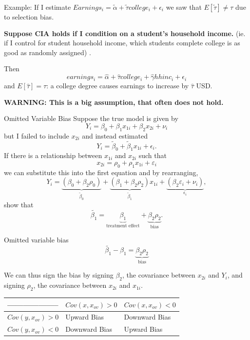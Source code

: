 \documentclass[
  ignorenonframetext,
]{beamer}
\begin{document}
\begin{frame}{Example:}
\protect\hypertarget{example-2}{}
If I estimate
\(Earnings_i=\tilde{\alpha}+\tilde{\tau}college_i+\epsilon_i\) we saw
that \(E[\tilde{\tau}]\neq\tau\) due to selection bias.

\textbf{Suppose CIA holds if I condition on a student's household
income.} (ie. if I control for student household income, which students
complete college is as good as randomly assigned) .

Then \[
earnings_i=\hat{\alpha}+\hat{\tau}college_i+\hat{\gamma}hhinc_i+\epsilon_i
\] and \(E[\hat{\tau}]=\tau\): a college degree causes earnings to
increase by \(\hat{\tau}\) USD.

\textbf{WARNING: This is a big assumption, that often does not hold.}
\end{frame}

\begin{frame}{Omitted Variable Bias}
\protect\hypertarget{omitted-variable-bias}{}
Suppose the true model is given by \[
Y_i=\beta_0+\beta_1 x_{1i}+\beta_2 x_{2i}+\nu_i
\] but I failed to include \(x_{2i}\) and instead estimated \[
Y_i=\tilde{\beta}_0+\tilde{\beta}_1 x_{1i}+\epsilon_i.
\] If there is a relationship between \(x_{1i}\) and \(x_{2i}\) such
that \[
x_{2i}=\rho_0+\rho_1 x_{1i}+\varepsilon_i
\] we can substitute this into the first equation and by rearranging, \[
Y_i=\underbrace{(\beta_0+\beta_2\rho_0)}_{\tilde{\beta}_0}+\underbrace{(\beta_1+\beta_2 \rho_2)}_{\tilde{\beta}_1} x_{1i}+\underbrace{(\beta_2 \varepsilon_i+\nu_i)}_{\epsilon_i},
\] show that \[
\tilde{\beta_1}=\underbrace{\beta_1}_\text{treatment effect}+\underbrace{\beta_2 \rho_2}_\text{bias}.
\]
\end{frame}

\begin{frame}{Omitted variable bias}
\protect\hypertarget{omitted-variable-bias-1}{}
\[
\tilde{\beta_1}-\beta_1=\underbrace{\beta_2 \rho_2}_\text{bias}
\]

We can thus sign the bias by signing \(\beta_2\), the covariance between
\(x_{2i}\) and \(Y_i\), and signing \(\rho_2\), the covariance between
\(x_{2i}\) and \(x_{1i}\).

\begin{longtable}[]{@{}lll@{}}
\toprule
-------------------- & \(Cov(x,x_{ov})>0\) &
\(Cov(x,x_{ov})<0\)\tabularnewline
\midrule
\endhead
\(Cov(y,x_{ov})>0\) & Upward Bias & Downward Bias\tabularnewline
\(Cov(y,x_{ov})<0\) & Downward Bias & Upward Bias\tabularnewline
\bottomrule
\end{longtable}
\end{frame}
\end{document}
